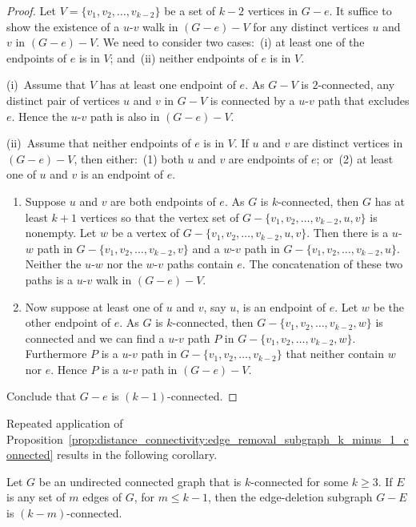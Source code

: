\begin{proof}
Let $V = \{v_1, v_2, \dots, v_{k-2}\}$ be a set of $k - 2$ vertices in
$G - e$. It suffice to show the existence of a $u$-$v$ walk in
$(G - e) - V$ for any distinct vertices $u$ and $v$ in
$(G - e) - V$. We need to consider two cases:~(i) at least one of the
endpoints of $e$ is in $V$; and~(ii) neither endpoints of $e$ is in
$V$.

(i)~Assume that $V$ has at least one endpoint of $e$. As $G - V$ is
$2$-connected, any distinct pair of vertices $u$ and $v$ in $G - V$ is
connected by a $u$-$v$ path that excludes $e$. Hence the $u$-$v$ path
is also in $(G - e) - V$.

(ii)~Assume that neither endpoints of $e$ is in $V$. If $u$ and $v$
are distinct vertices in $(G - e) - V$, then either:~(1) both $u$ and
$v$ are endpoints of $e$; or~(2) at least one of $u$ and $v$ is an
endpoint of $e$.
\begin{enumerate}[(1)]
\item Suppose $u$ and $v$ are both endpoints of $e$. As $G$ is
  $k$-connected, then $G$ has at least $k + 1$ vertices so that the
  vertex set of $G - \{v_1, v_2, \dots, v_{k-2}, u, v\}$ is
  nonempty. Let $w$ be a vertex of
  $G - \{v_1, v_2, \dots, v_{k-2}, u, v\}$. Then there is a $u$-$w$
  path in $G - \{v_1, v_2, \dots, v_{k-2}, v\}$ and a $w$-$v$ path in
  $G - \{v_1, v_2, \dots, v_{k-2}, u\}$. Neither the $u$-$w$ nor the
  $w$-$v$ paths contain $e$. The concatenation of these two paths is a
  $u$-$v$ walk in $(G - e) - V$.

\item Now suppose at least one of $u$ and $v$, say $u$, is an endpoint
  of $e$. Let $w$ be the other endpoint of $e$. As $G$ is
  $k$-connected, then $G - \{v_1, v_2, \dots, v_{k-2}, w\}$ is
  connected and we can find a $u$-$v$ path $P$ in
  $G - \{v_1, v_2, \dots, v_{k-2}, w\}$. Furthermore $P$ is a $u$-$v$
  path in $G - \{v_1, v_2, \dots, v_{k-2}\}$ that neither contain $w$
  nor $e$. Hence $P$ is a $u$-$v$ path in $(G - e) - V$.
\end{enumerate}
Conclude that $G - e$ is $(k - 1)$-connected.
\end{proof}

Repeated application of
Proposition~\ref{prop:distance_connectivity:edge_removal_subgraph_k_minus_1_connected}
results in the following corollary.

\begin{corollary}
Let $G$ be an undirected connected graph that is $k$-connected for
some $k \geq 3$. If $E$ is any set of $m$ edges of $G$, for
$m \leq k - 1$, then the edge-deletion subgraph $G - E$ is
$(k - m)$-connected.
\end{corollary}


